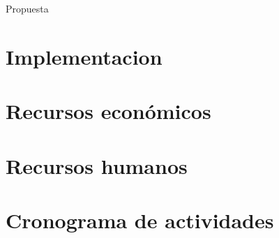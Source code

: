 \documentclass{article}
\begin{document}
Propuesta

\section{Implementacion}


\section{Recursos económicos}

\section{Recursos humanos}

\section{Cronograma de actividades}



\end{document}
